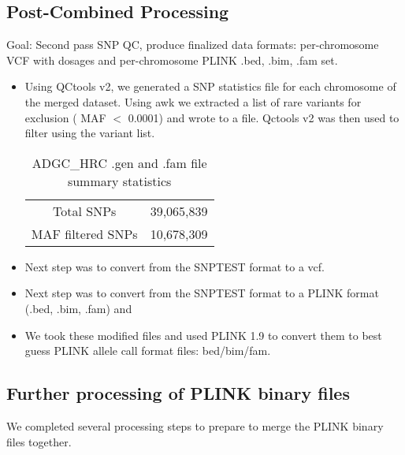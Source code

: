 \documentclass[12pt]{article}
\begin{document}
\subsection{Post-Combined Processing}

Goal: Second pass SNP QC, produce finalized data formats: per-chromosome VCF with dosages and per-chromosome PLINK .bed, .bim, .fam set.

\begin{itemize}

\item Using QCtools v2, we generated a SNP statistics file for each chromosome of the merged dataset. Using awk we extracted a list of rare variants for exclusion ( MAF $<$ 0.0001) and wrote to a file. Qctools v2 was then used to filter using the variant list.

\begin{table}[H] \caption{ADGC\_HRC .gen and .fam file summary statistics}
\begin{center}
\begin{tabular}{cc}
\hline
Total SNPs & 39,065,839 \\
MAF filtered SNPs & 10,678,309 \\
\end{tabular}
\end{center}
\label{table:full}
\end{table}

\item Next step was to convert from the SNPTEST format to a vcf.

\item Next step was to convert from the SNPTEST format to a PLINK format (.bed, .bim, .fam) and

\item We took these modified files and used PLINK 1.9 to convert them to best guess PLINK allele call format files: bed/bim/fam.


\end{itemize}

\subsection{Further processing of PLINK binary files}

We completed several processing steps to prepare to merge the PLINK binary files together.
\end{document}
